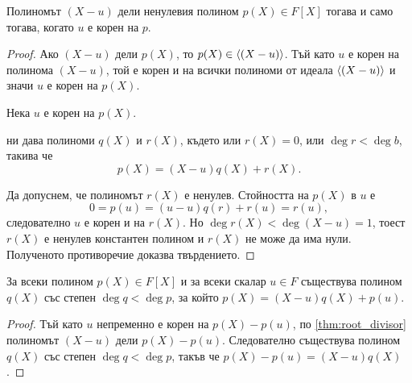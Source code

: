 \documentclass[
  headings=standardclasses,
  bibliography=totocnumbered,
]{scrartcl}
\begin{document}
\begin{proposition}\label{thm:root_divisor}
  Полиномът \( (X - u) \) дели ненулевия полином \( p(X) \in F[X] \) тогава и само тогава, когато \( u \) е корен на \( p \).
\end{proposition}
\begin{proof}
  \Sufficiency Ако \( (X - u) \) дели \( p(X) \), то \( p(X) \in \left\langle (X - u) \right\rangle \). Тъй като \( u \) е корен на полинома \( (X - u) \), той е корен и на всички полиноми от идеала \( \left\langle (X - u) \right\rangle \) и значи \( u \) е корен на \( p(X) \).

  \Necessity Нека \( u \) е корен на \( p(X) \).

   ни дава полиноми \( q(X) \) и \( r(X) \), където или \( r(X) = 0 \), или \( \deg r < \deg b \), такива че
  \begin{equation*}
    p(X) = (X - u) q(X) + r(X).
  \end{equation*}

  Да допуснем, че полиномът \( r(X) \) е ненулев. Стойността на \( p(X) \) в \( u \) е
  \begin{equation*}
    0 = p(u) = (u - u) q(r) + r(u) = r(u),
  \end{equation*}
  следователно \( u \) е корен и на \( r(X) \). Но \( \deg r(X) < \deg (X - u) = 1 \), тоест \( r(X) \) е ненулев константен полином и \( r(X) \) не може да има нули. Полученото противоречие доказва твърдението.
\end{proof}

\begin{proposition}\label{thm:root_inexact_divisor}
  За всеки полином \( p(X) \in F[X] \) и за всеки скалар \( u \in F \) съществува полином \( q(X) \) със степен \( \deg q < \deg p \), за който \( p(X) = (X - u) q(X) + p(u) \).
\end{proposition}
\begin{proof}
  Тъй като \( u \) непременно е корен на \( p(X) - p(u) \), по \cref{thm:root_divisor} полиномът \( (X - u) \) дели \( p(X) - p(u) \). Следователно съществува полином \( q(X) \) със степен \( \deg q < \deg p \), такъв че \( p(X) - p(u) = (X - u) q(X) \).
\end{proof}
\end{document}
